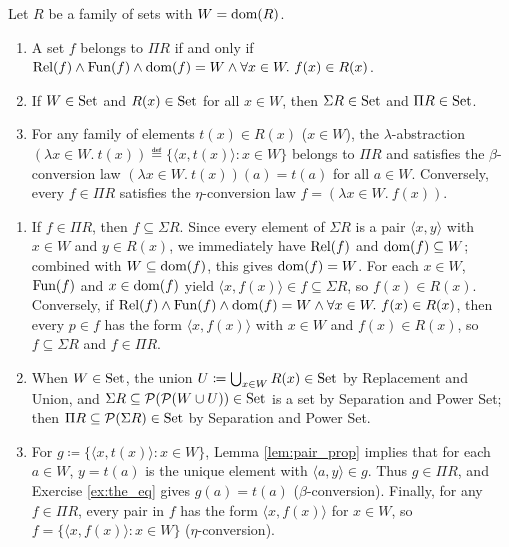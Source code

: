 \documentclass[10pt,a4paper]{article}
\begin{document}
\begin{lemma}\label{lem:sigma_pi}
Let $R$ be a family of sets with $W = {\textrm{dom}}(R)$.
\begin{enumerate}
\item A set $f$ belongs to $\Pi R$ if and only if ${\textrm{Rel}}(f) \land {\textrm{Fun}}(f) \land {\textrm{dom}}(f) = W \land \forall x \in W.\ f(x) \in R(x)$.
\item If $W \in {\textrm{Set}}$ and $R(x) \in {\textrm{Set}}$ for all $x \in W$, then $\Sigma R \in {\textrm{Set}}$ and $\Pi R \in {\textrm{Set}}$.
\item For any family of elements $t(x) \in R(x)$ ($x \in W$), the $\lambda$-abstraction $(\lambda x \in W.\ t(x)) \eqdef \{\langle x, t(x) \rangle : x \in W\}$ belongs to $\Pi R$ and satisfies the $\beta$-conversion law $(\lambda x \in W.\ t(x))(a) = t(a)$ for all $a \in W$. Conversely, every $f \in \Pi R$ satisfies the $\eta$-conversion law $f = (\lambda x \in W.\ f(x))$.
\end{enumerate}
\end{lemma}
\myprf
\begin{enumerate}
\item If $f \in \Pi R$, then $f \subseteq \Sigma R$. Since every element of $\Sigma R$ is a pair $\langle x, y \rangle$ with $x \in W$ and $y \in R(x)$, we immediately have ${\textrm{Rel}}(f)$ and ${\textrm{dom}}(f) \subseteq W$; combined with $W \subseteq {\textrm{dom}}(f)$, this gives ${\textrm{dom}}(f) = W$. For each $x \in W$, ${\textrm{Fun}}(f)$ and $x \in {\textrm{dom}}(f)$ yield $\langle x, f(x) \rangle \in f \subseteq \Sigma R$, so $f(x) \in R(x)$. Conversely, if ${\textrm{Rel}}(f) \land {\textrm{Fun}}(f) \land {\textrm{dom}}(f) = W \land \forall x \in W.\ f(x) \in R(x)$, then every $p \in f$ has the form $\langle x, f(x) \rangle$ with $x \in W$ and $f(x) \in R(x)$, so $f \subseteq \Sigma R$ and $f \in \Pi R$.
\item When $W \in {\textrm{Set}}$, the union $U \coloneqq \bigcup_{x \in W} R(x) \in {\textrm{Set}}$ by Replacement and Union, and $\Sigma R \subseteq {\mathcal{P}}({\mathcal{P}}(W \cup U)) \in {\textrm{Set}}$ is a set by Separation and Power Set; then $\Pi R \subseteq {\mathcal{P}}(\Sigma R) \in {\textrm{Set}}$ by Separation and Power Set.
\item For $g \coloneqq \{\langle x, t(x) \rangle : x \in W\}$, Lemma \ref{lem:pair_prop} implies that for each $a \in W$, $y = t(a)$ is the unique element with $\langle a, y \rangle \in g$. Thus $g \in \Pi R$, and Exercise \ref{ex:the_eq} gives $g(a) = t(a)$ ($\beta$-conversion). Finally, for any $f \in \Pi R$, every pair in $f$ has the form $\langle x, f(x) \rangle$ for $x \in W$, so $f = \{\langle x, f(x) \rangle : x \in W\}$ ($\eta$-conversion).
\end{enumerate}
\myqed
\end{document}

